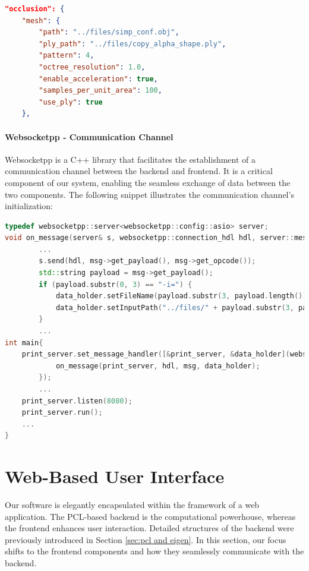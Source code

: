 \documentclass[11pt, a4paper,oneside,chapterprefix=false]{scrbook}
\begin{document}
\begin{lstlisting}[language=json, caption=Json Configuration File]
"occlusion": {
    "mesh": {
        "path": "../files/simp_conf.obj",
        "ply_path": "../files/copy_alpha_shape.ply",
        "pattern": 4,
        "octree_resolution": 1.0,
        "enable_acceleration": true,
        "samples_per_unit_area": 100,
        "use_ply": true
    },
\end{lstlisting}

\paragraph{Websocketpp - Communication Channel} \label{par:websocketpp}

Websocketpp is a C++ library that facilitates the establishment of a communication channel between the backend and frontend. It is a critical component of our system, enabling the seamless exchange of data between the two components. The following snippet illustrates the communication channel's initialization:

\begin{lstlisting}[language=C++, caption=Websocket Server]
typedef websocketpp::server<websocketpp::config::asio> server;
void on_message(server& s, websocketpp::connection_hdl hdl, server::message_ptr msg, DataHolder& data_holder) {
        ...
		s.send(hdl, msg->get_payload(), msg->get_opcode());
		std::string payload = msg->get_payload();
		if (payload.substr(0, 3) == "-i=") {
			data_holder.setFileName(payload.substr(3, payload.length()));
			data_holder.setInputPath("../files/" + payload.substr(3, payload.length()));
		}
		...
int main{
	print_server.set_message_handler([&print_server, &data_holder](websocketpp::connection_hdl hdl, server::message_ptr msg) {
            on_message(print_server, hdl, msg, data_holder);
        });
        ...
	print_server.listen(8080);
	print_server.run();
	...	
}
\end{lstlisting}

\section{Web-Based User Interface} \label{sec:three.js}

Our software is elegantly encapsulated within the framework of a web application. The PCL-based backend is the computational powerhouse, whereas the frontend enhances user interaction. Detailed structures of the backend were previously introduced in Section \ref{sec:pcl and eigen}. In this section, our focus shifts to the frontend components and how they seamlessly communicate with the backend.
\end{document}

